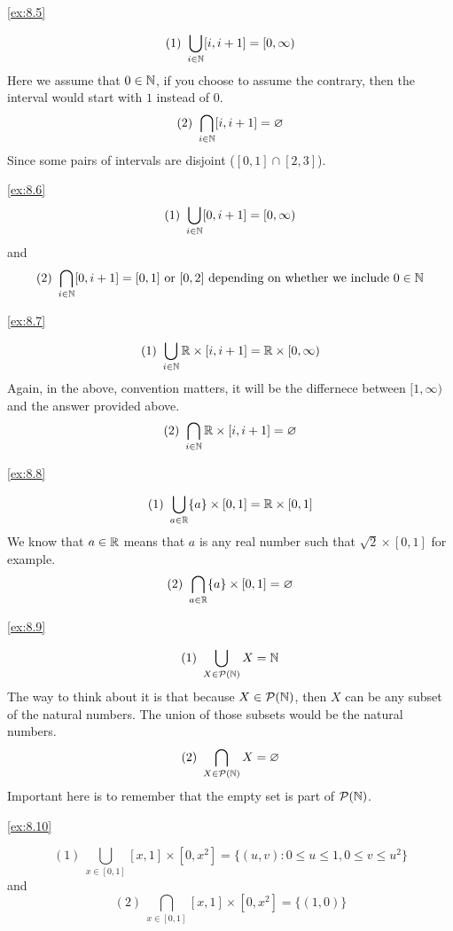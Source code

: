 \begin{solution}\label{sol:8.5}\ref{ex:8.5}
    
    $$
    (1)~ \bigcup_{i\in\mathbb{N}}[i,i+1]=[0,\infty)
    $$
    Here we assume that $0\in\mathbb{N}$, if you choose to assume the contrary, then the interval would start with $1$ instead of $0$.
    $$
    (2)~\bigcap_{i\in\mathbb{N}}[i,i+1]=\varnothing
    $$
    Since some pairs of intervals are disjoint ($[0,1]\cap[2,3]$). 
\end{solution}


\begin{solution}\label{sol:8.6}\ref{ex:8.6}
    $$
    (1)~\bigcup_{i\in\mathbb{N}}[0,i+1]=[0,\infty)
    $$
    and 
    $$
    (2)~\bigcap_{i\in\mathbb{N}}[0,i+1]=[0,1] \text{ or } [0,2] \text{ depending on whether we include } 0\in\mathbb{N}
    $$
\end{solution}


\begin{solution}\label{sol:8.7}\ref{ex:8.7}
    
    $$
    (1)~\bigcup_{i\in\mathbb{N}}\mathbb{R}\times[i,i+1]=\mathbb{R}\times [0,\infty)
    $$
    Again, in the above, convention matters, it will be the differnece between $[1,\infty)$ and the answer provided above. 
    $$
    (2)~\bigcap_{i\in\mathbb{N}}\mathbb{R}\times[i,i+1]=\varnothing
    $$
\end{solution}


\begin{solution}\label{sol:8.8}\ref{ex:8.8}
    
    $$
    (1)~\bigcup_{a\in\mathbb{R}}\{ a \}\times[0,1]=\mathbb{R} \times [0,1]
    $$
    We know that $a\in\mathbb{R}$ means that $a$ is any real number such that $\sqrt2\times[0,1]$ for example. 
    $$
    (2)~\bigcap_{a\in\mathbb{R}}\{ a \}\times[0,1]=\varnothing
    $$
\end{solution}


\begin{solution}\label{sol:8.9}\ref{ex:8.9}
    
    $$
    (1)~\bigcup_{X\in\mathcal{P}(\mathbb{N})}X=\mathbb{N}
    $$
    The way to think about it is that because $X\in\mathcal{P}(\mathbb{N})$, then $X$ can be any subset of the natural numbers. The union of those subsets would be the natural numbers. 
    $$
    (2)~\bigcap_{X\in\mathcal{P}(\mathbb{N})}X=\varnothing
    $$
    Important here is to remember that the empty set is part of $\mathcal{P}(\mathbb{N})$.
\end{solution}

\begin{solution}\label{sol:8.10}\ref{ex:8.10}
    
    $$
    (1)~\bigcup_{x\in[0,1]}[x,1]\times[0,x^{2}]=\{ (u,v):0\le u\le 1, 0\le v \le u^{2} \}
    $$
    and 
    $$
    (2)~\bigcap_{x\in[0,1]}[x,1]\times[0,x^{2}]=\{ (1,0) \}
    $$
\end{solution}


